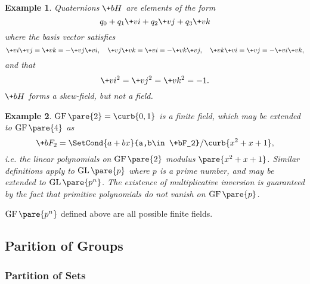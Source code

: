 \documentclass[hidelinks]{article}
\newtheorem{example}{Example}
\DeclareMathOperator{\GF}{GF}
\DeclareMathOperator{\GL}{GL}
\begin{document}
\begin{sample}
    \begin{example}
        Quaternions $\+bH$ are elements of the form
        \[ q_0 + q_1 \+vi + q_2 \+vj + q_3 \+vk \]
        where the basis vector satisfies
        \[ \+vi\+vj = \+vk = -\+vj\+vi, \quad \+vj\+vk=\+vi = -\+vk\+vj,\quad \+vk\+vi = \+vj = -\+vi\+vk, \]
        and that
        \[ \+vi^2 = \+vj^2 = \+vk^2 = -1. \]
        $\+bH$ forms a skew-field, but not a field.
    \end{example}
\end{sample}
\begin{sample}
    \begin{example}
        $\GF\pare{2} = \curb{0,1}$ is a finite field, which may be extended to $\GF\pare{4}$ as
        \[ \+bF_2 = \SetCond{a+bx}{a,b\in \+bF_2}/\curb{x^2+x+1}, \]
        i.e. the linear polynomials on $\GF\pare{2}$ modulus $\pare{x^2 + x + 1}$. Similar definitions apply to $\GL\pare{p}$ where $p$ is a prime number, and may be extended to $\GL\pare{p^n}$. The existence of multiplicative inversion is guaranteed by the fact that primitive polynomials do not vanish on $\GF\pare{p}$.
    \end{example}
\end{sample}
$\GF\pare{p^n}$ defined above are all possible finite fields.



\subsection{Parition of Groups} %
\label{sub:parition_of_groups}

\subsubsection{Partition of Sets} %
\label{ssub:partition_of_sets}
\end{document}
